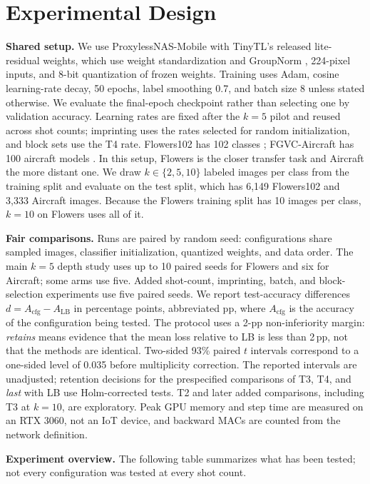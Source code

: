 \documentclass[sigconf,nonacm]{acmart}
\begin{document}
\section{Experimental Design}
\textbf{Shared setup.} We use ProxylessNAS-Mobile \cite{cai2019proxylessnas} with TinyTL's released lite-residual weights, which use weight standardization and GroupNorm \cite{qiao2019ws,wu2018groupnorm}, 224-pixel inputs, and 8-bit quantization of frozen weights. Training uses Adam, cosine learning-rate decay, 50 epochs, label smoothing 0.7, and batch size 8 unless stated otherwise. We evaluate the final-epoch checkpoint rather than selecting one by validation accuracy. Learning rates are fixed after the $k=5$ pilot and reused across shot counts; imprinting uses the rates selected for random initialization, and block sets use the T4 rate. Flowers102 has 102 classes \cite{nilsback2008flowers}; FGVC-Aircraft has 100 aircraft models \cite{maji2013aircraft}. In this setup, Flowers is the closer transfer task and Aircraft the more distant one. We draw $k\in\{2,5,10\}$ labeled images per class from the training split and evaluate on the test split, which has 6,149 Flowers102 and 3,333 Aircraft images. Because the Flowers training split has 10 images per class, $k=10$ on Flowers uses all of it.

\textbf{Fair comparisons.} Runs are paired by random seed: configurations share sampled images, classifier initialization, quantized weights, and data order. The main $k=5$ depth study uses up to 10 paired seeds for Flowers and six for Aircraft; some arms use five. Added shot-count, imprinting, batch, and block-selection experiments use five paired seeds. We report test-accuracy differences $d=A_{\mathrm{cfg}}-A_{\mathrm{LB}}$ in percentage points, abbreviated pp, where $A_{\mathrm{cfg}}$ is the accuracy of the configuration being tested. The protocol uses a 2-pp non-inferiority margin: \emph{retains} means evidence that the mean loss relative to LB is less than 2\,pp, not that the methods are identical. Two-sided 93\% paired $t$ intervals correspond to a one-sided level of 0.035 before multiplicity correction. The reported intervals are unadjusted; retention decisions for the prespecified comparisons of T3, T4, and \emph{last} with LB use Holm-corrected tests. T2 and later added comparisons, including T3 at $k=10$, are exploratory. Peak GPU memory and step time are measured on an RTX 3060, not an IoT device, and backward MACs are counted from the network definition.

\textbf{Experiment overview.} The following table summarizes what has been tested; not every configuration was tested at every shot count.
\end{document}
